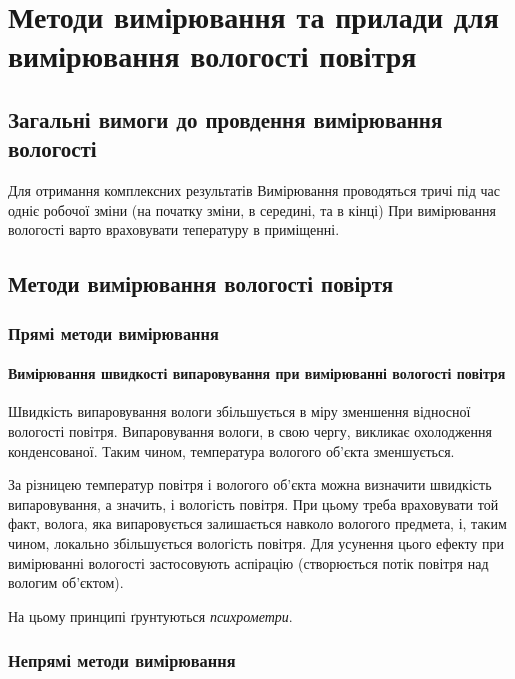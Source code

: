 \chapter{Методи вимірювання та прилади для вимірювання вологості повітря}

\section{Загальні вимоги до провдення  вимірювання вологості}

Для отримання комплексних результатів Вимірювання проводяться тричі під час одніє робочої зміни (на
початку зміни, в середині, та в кінці) При вимірювання вологості варто враховувати тепературу в
приміщенні.

\section{Методи вимірювання вологості повіртя}

\subsection{Прямі методи вимірювання}

\tocless\subsubsection{Вимірювання швидкості випаровування при вимірюванні вологості повітря}

Швидкість випаровування вологи збільшується в міру зменшення відносної вологості повітря.
Випаровування вологи, в свою чергу, викликає охолодження конденсованої. Таким чином, температура
вологого об'єкта зменшується.

За різницею температур повітря і вологого об'єкта можна визначити
швидкість випаровування, а значить, і вологість повітря. При цьому треба враховувати той факт,
волога, яка випаровується залишається навколо вологого предмета, і, таким чином, локально
збільшується вологість повітря. Для усунення цього ефекту при вимірюванні вологості застосовують
аспірацію (створюється потік повітря над вологим об'єктом).

На цьому принципі ґрунтуються \textit{психрометри}.

\subsection{Непрямі методи вимірювання}


